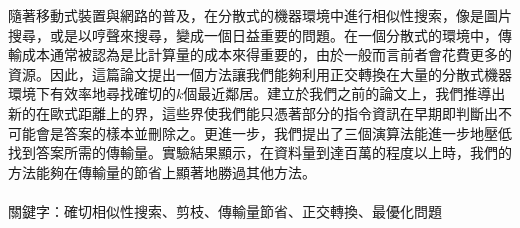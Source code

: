 \begin{abstractCH}

隨著移動式裝置與網路的普及，在分散式的機器環境中進行相似性搜索，像是圖片搜尋，或是以哼聲來搜尋，變成一個日益重要的問題。在一個分散式的環境中，傳輸成本通常被認為是比計算量的成本來得重要的，由於一般而言前者會花費更多的資源。因此，這篇論文提出一個方法讓我們能夠利用正交轉換在大量的分散式機器環境下有效率地尋找確切的$k$個最近鄰居。建立於我們之前的論文上，我們推導出新的在歐式距離上的界，這些界使我們能只憑著部分的指令資訊在早期即判斷出不可能會是答案的樣本並刪除之。更進一步，我們提出了三個演算法能進一步地壓低找到答案所需的傳輸量。實驗結果顯示，在資料量到達百萬的程度以上時，我們的方法能夠在傳輸量的節省上顯著地勝過其他方法。
\\
\\
  關鍵字：確切相似性搜索、剪枝、傳輸量節省、正交轉換、最優化問題

\end{abstractCH}
